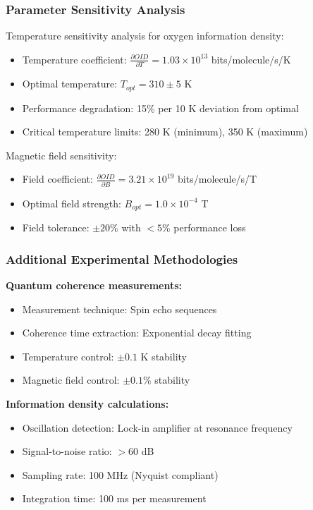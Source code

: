 \subsubsection{Parameter Sensitivity Analysis}

Temperature sensitivity analysis for oxygen information density:
\begin{itemize}
    \item Temperature coefficient: $\frac{\partial OID}{\partial T} = 1.03 \times 10^{13}$ bits/molecule/s/K
    \item Optimal temperature: $T_{opt} = 310 \pm 5$ K
    \item Performance degradation: 15\% per 10 K deviation from optimal
    \item Critical temperature limits: 280 K (minimum), 350 K (maximum)
\end{itemize}

Magnetic field sensitivity:
\begin{itemize}
    \item Field coefficient: $\frac{\partial OID}{\partial B} = 3.21 \times 10^{19}$ bits/molecule/s/T
    \item Optimal field strength: $B_{opt} = 1.0 \times 10^{-4}$ T
    \item Field tolerance: $\pm 20\%$ with $<5\%$ performance loss
\end{itemize}

\subsubsection{Additional Experimental Methodologies}

\textbf{Quantum coherence measurements:}
\begin{itemize}
    \item Measurement technique: Spin echo sequences
    \item Coherence time extraction: Exponential decay fitting
    \item Temperature control: $\pm 0.1$ K stability
    \item Magnetic field control: $\pm 0.1\%$ stability
\end{itemize}

\textbf{Information density calculations:}
\begin{itemize}
    \item Oscillation detection: Lock-in amplifier at resonance frequency
    \item Signal-to-noise ratio: $>60$ dB
    \item Sampling rate: 100 MHz (Nyquist compliant)
    \item Integration time: 100 ms per measurement
\end{itemize}


